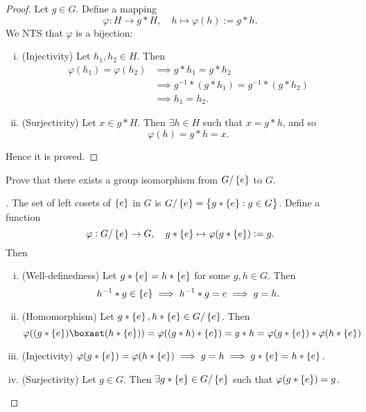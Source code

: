 \documentclass[11pt,openany]{article}
\begin{document}
\newpage
{}
\begin{proof}
Let $g\in G$. Define a mapping \[
\varphi:H\to g\ast H,\quad h\mapsto \varphi(h):=g\ast h.
\] We NTS that $\varphi$ is a bijection: \begin{enumerate}[(i)]
	\item (Injectivity)\; Let $h_1,h_2\in H$. Then \begin{align*}
		\varphi(h_1)=\varphi(h_2) &\implies g\ast h_1= g\ast h_2\\
		&\implies g^{-1}\ast (g\ast h_1)=g^{-1}\ast(g\ast h_2)\\
		&\implies h_1=h_2.
	\end{align*}
	\item (Surjectivity)\; Let $x\in g\ast H$. Then $\exists h\in H$ such that $x=g\ast h$, and so \[
	\varphi(h)=g\ast h=x.
	\]
\end{enumerate} Hence it is proved.
\end{proof}

\newpage
{}
\begin{exercise*}
	Prove that there exists a group isomorphism from $G/\set{e}$ to $G$.
	\begin{proof}[\sol]
		The set of left cosets of $\set{e}$ in $G$ is $G/\set{e}=\set{g\ast\set{e}:g\in G}$. Define a function \[
		\varphi:G/\set{e}\to G,\quad g\ast\set{e}\mapsto\varphi(g\ast\set{e}):=g.
		\] Then \begin{enumerate}[(i)]
			\item (Well-definedness)\; Let $g\ast\set{e}=h\ast\set{e}$ for some $g,h\in G$. Then \[
			h^{-1}\ast g\in\set{e}\implies h^{-1}\ast g=e\implies g=h.
			\]
			\item (Homomorphism)\; Let $g\ast\set{e},h\ast\set{e}\in G/\set{e}$. Then \[
			\varphi((g\ast\set{e})\boxast(h\ast\set{e}))=\varphi((g\ast h)\ast\set{e})=g\ast h=\varphi(g\ast\set{e})\ast \varphi(h\ast\set{e})
			\]
			\item (Injectivity)\; $\varphi(g\ast\set{e})=\varphi(h\ast\set{e})\implies g=h\implies g\ast\set{e}=h\ast\set{e}$.
			\item (Surjectivity)\; Let $g\in G$. Then $\exists g\ast\set{e}\in G/\set{e}$ such that $\varphi(g\ast\set{e})=g$.
		\end{enumerate}
	\end{proof}
\end{exercise*}
\end{document}
